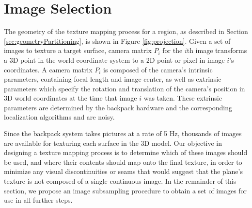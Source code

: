\documentclass[]{spie}  %
\begin{document}
\section{Image Selection}
\label{sec:imageSelection}

The geometry of the texture mapping process for a region, as described
in Section \ref{sec:geometryPartitioning}, is shown in Figure
\ref{fig:projection}. Given a set of images to texture a target
surface, camera matrix $P_i$ for the $i$th image transforms a 3D point
in the world coordinate system to a 2D point or pixel in image $i$'s
coordinates. A camera matrix $P_i$ is composed of the camera's
intrinsic parameters, containing focal length and image center, as
well as extrinsic parameters which specify the rotation and
translation of the camera's position in 3D world coordinates at the
time that image $i$ was taken. These extrinsic parameters are
determined by the backpack hardware and the corresponding localization
algorithms \cite{chen2010indoor, liu2010indoor, kua2012loopclosure}
and are noisy.

Since the backpack system takes pictures at a rate of 5 Hz, thousands
of images are available for texturing each surface in the 3D
model. Our objective in designing a texture mapping process is to
determine which of these images should be used, and where their
contents should map onto the final texture, in order to minimize any
visual discontinuities or seams that would suggest that the plane's
texture is not composed of a single continuous image. In the remainder
of this section, we propose an image subsampling procedure to obtain a
set of images for use in all further steps.
\end{document}
